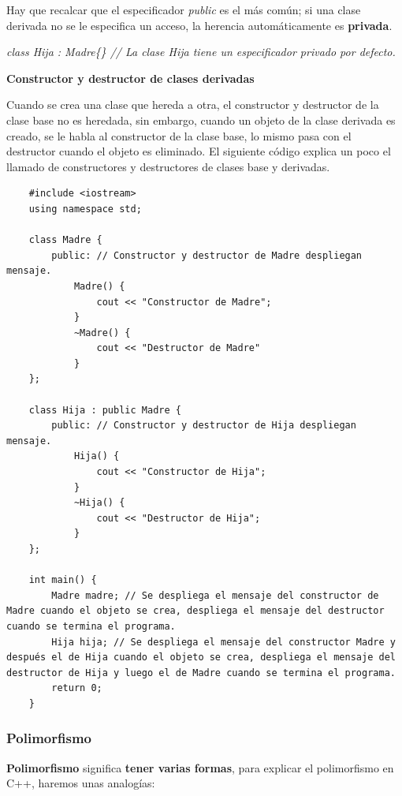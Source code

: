 Hay que recalcar que el especificador \textit{public} es el más común; si una clase derivada no se le especifica un acceso, la herencia automáticamente es \textbf{privada}.
\begin{center}
	\textit{class Hija : Madre\{\} // La clase Hija tiene un especificador privado por defecto.}
\end{center}

\textbf{Constructor y destructor de clases derivadas}

Cuando se crea una clase que hereda a otra, el constructor y destructor de la clase base no es heredada, sin embargo, cuando un objeto de la clase derivada es creado, se le habla al constructor de la clase base, lo mismo pasa con el destructor cuando el objeto es eliminado. El siguiente código explica un poco el llamado de constructores y destructores de clases base y derivadas.
\begin{lstlisting}
    #include <iostream>
    using namespace std;
    
    class Madre {
        public: // Constructor y destructor de Madre despliegan mensaje.
            Madre() {
                cout << "Constructor de Madre";
            }
            ~Madre() {
                cout << "Destructor de Madre"
            }
    };
    
    class Hija : public Madre {
        public: // Constructor y destructor de Hija despliegan mensaje.
            Hija() {
                cout << "Constructor de Hija";
            }
            ~Hija() {
                cout << "Destructor de Hija";
            }
    };
    
    int main() {
        Madre madre; // Se despliega el mensaje del constructor de Madre cuando el objeto se crea, despliega el mensaje del destructor cuando se termina el programa.
        Hija hija; // Se despliega el mensaje del constructor Madre y después el de Hija cuando el objeto se crea, despliega el mensaje del destructor de Hija y luego el de Madre cuando se termina el programa.
        return 0;
    }
\end{lstlisting}


\subsubsection{Polimorfismo}
\hspace{0.55cm}\textbf{Polimorfismo} significa \textbf{tener varias formas}, para explicar el polimorfismo en C++, haremos unas analogías:

